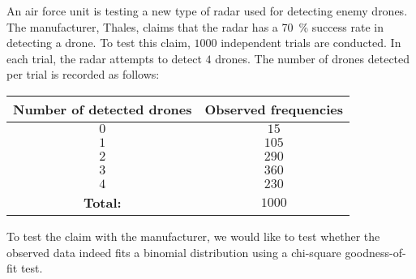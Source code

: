 \begin{enquestion}{20}{
    An air force unit is testing a new type of radar used for detecting enemy drones.
    The manufacturer, Thales, claims that the radar has a \SI{70}{\percent} success rate in detecting a drone.
    To test this claim, $1000$ independent trials are conducted. In each trial, the radar attempts to detect $4$ drones. The number of drones detected per trial is recorded as follows:
    \begin{table}[htbp!]
        \centering
        \begin{tabular}{cc}
            \toprule
                \textbf{Number of detected drones} & \textbf{Observed frequencies} \\
            \midrule
                $0$ & $15$ \\
                $1$ & $105$ \\
                $2$ & $290$ \\
                $3$ & $360$ \\
                $4$ & $230$ \\
            \midrule
                \textbf{Total:} & $1000$ \\
            \bottomrule
        \end{tabular}
    \end{table}

    To test the claim with the manufacturer, we would like to test whether the observed data indeed fits a binomial distribution using a chi-square goodness-of-fit test.
}



\end{enquestion}
